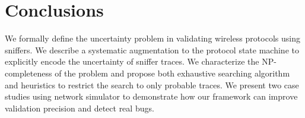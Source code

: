 \section{Conclusions}
\label{sec:conclusion}

We formally define the uncertainty problem in validating
wireless protocols using sniffers. We describe a systematic augmentation to the
protocol state machine to explicitly encode the uncertainty of sniffer traces.
We characterize the NP-completeness of the problem and propose both exhaustive
searching algorithm and heuristics to restrict the search to only probable
traces. We present two case studies using \ns{} network simulator to demonstrate
how our framework can improve validation precision and detect real bugs.

\begin{comment}
Finally, we discuss a few challenges and future
directions.

\textbf{Verification Coverage.} Given a single sniffer trace, it is possible
that not all the states in the state machine are visited during the verification
process. For instance, a rate control state machine based on certain consecutive
packet losses patterns can not be verified if no such consecutive losses appear
in the sniffer trace. In general, given a protocol state machine, how to extract
the packet patterns for each state to be reached and how to alter the testing
such that such patterns can be observed?

\textbf{State Machine Generation.} We manually translated the protocols studied
in this paper into monitor state machines based on the source code, comments and
documentation. The process is time-consuming and error-prone. A more scalable
approach would be taking the protocol specification written in certain formal
language, and automatically translate such specification into state machines
that can be used for verification process.

\end{comment}
